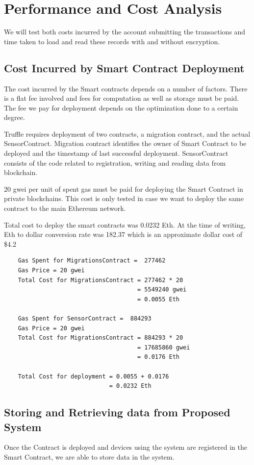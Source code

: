\documentclass[11pt,openright]{report}
\begin{document}
\chapter{Performance and Cost Analysis}
\label{chapter:experiment_results}
We will test both costs incurred by the account submitting the transactions and time taken to load and read these records with and without encryption.

\section{Cost Incurred by Smart Contract Deployment}
The cost incurred by the Smart contracts depends on a number of factors. There is a flat fee involved and fees for computation as well as storage must be paid. The fee we pay for deployment depends on the optimization done to a certain degree. 

Truffle requires deployment of two contracts, a migration contract, and the actual SensorContract. Migration contract identifies the owner of Smart Contract to be deployed and the timestamp of last successful deployment. SensorContract consists of the code related to registration, writing and reading data from blockchain. 

20 gwei per unit of spent gas must be paid for deploying the Smart Contract in private blockchains. This cost is only tested in case we want to deploy the same contract to the main Ethereum network. 

Total cost to deploy the smart contracts was 0.0232 Eth. At the time of writing, Eth to dollar conversion rate was 182.37 which is an approximate dollar cost of \$4.2


\begin{lstlisting}
    Gas Spent for MigrationsContract =  277462
    Gas Price = 20 gwei
    Total Cost for MigrationsContract = 277462 * 20
                                      = 5549240 gwei
                                      = 0.0055 Eth
    
    Gas Spent for SensorContract =  884293
    Gas Price = 20 gwei
    Total Cost for MigrationsContract = 884293 * 20
                                      = 17685860 gwei
                                      = 0.0176 Eth                           
    
    Total Cost for deployment = 0.0055 + 0.0176
                              = 0.0232 Eth
\end{lstlisting}


\section{Storing and Retrieving data from Proposed System}
Once the Contract is deployed and devices using the system are registered in the Smart Contract, we are able to store data in the system.
\end{document}
